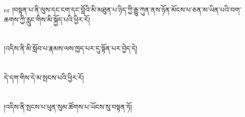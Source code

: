er{ }།བསྟན་པ་ནི་ལུས་དང་ངག་དང་བློའི་མི་མཐུན་པ་ཉིད་ཀྱི་རྒྱུ་ཀུན་ནས་ཉོན་མོངས་པ་ཅན་མ་ཡིན་པའི་བག་ཆགས་ཀྱི་རླུང་གིས་མི་སྐྱོད་པའི་ཕྱིར་རོ།\chapter{ }།འདིས་ནི་མི་སློབ་པ་རྣམས་ལས་ཁྱད་པར་དུ་སྟོན་པར་བྱེད་དེ།\chapter{ }དེ་དག་གིས་དེ་མ་སྤངས་པའི་ཕྱིར་རོ།\chapter{ }།འདིས་ནི་སྤངས་པ་ཕུན་སུམ་ཚོགས་པ་ཡོངས་སུ་བསྟན་ཏོ།\